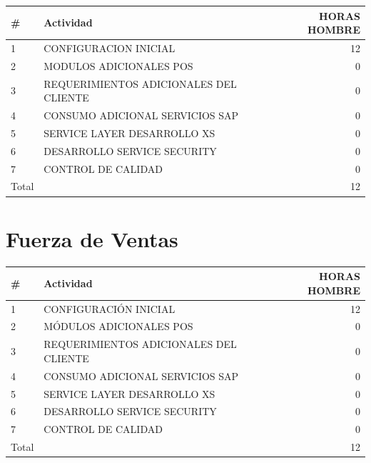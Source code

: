 \documentclass[pdftex,12pt,oneside,a4paper,spanish, english, brazil]{abntex2}
\begin{document}
\begin{sloppypar}
\begin{table}[htbp]
             	\begin{tabular}{llr}       		
             		\# & Actividad & HORAS HOMBRE\\
             		\midrule
             		1 &	CONFIGURACION INICIAL	& 12 \\
             		2 &	MODULOS ADICIONALES POS	& 0 \\
             		3 &	REQUERIMIENTOS ADICIONALES DEL CLIENTE	& 0 \\
             		4 &	CONSUMO ADICIONAL SERVICIOS SAP	& 0 \\
             		5 &	SERVICE LAYER DESARROLLO XS	& 0 \\
             		6 &	DESARROLLO SERVICE SECURITY	& 0 \\
             		7 &	CONTROL DE CALIDAD	& 0 \\
             		\bottomrule
             		Total & &12 \\
             	\end{tabular}%
             \end{table}%
             \section{Fuerza de Ventas}
             \begin{table}[htbp]
             	\small
             	\centering
             	
             	\begin{tabular}{llr}       		
             		\# & Actividad & HORAS HOMBRE\\
             		\midrule
             		1 &	CONFIGURACIÓN INICIAL	& 12 \\
             		2 &	MÓDULOS ADICIONALES POS	& 0 \\
             		3 &	REQUERIMIENTOS ADICIONALES DEL CLIENTE	& 0 \\
             		4 &	CONSUMO ADICIONAL SERVICIOS SAP	& 0 \\
             		5 &	SERVICE LAYER DESARROLLO XS	& 0 \\
             		6 &	DESARROLLO SERVICE SECURITY	& 0 \\
             		7 &	CONTROL DE CALIDAD	& 0 \\
             		\bottomrule
             		Total & & 12 \\
             	\end{tabular}%
             \end{table}%
    \end{sloppypar}
\end{document}
